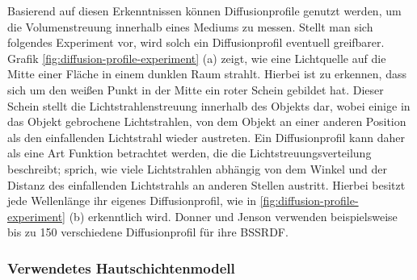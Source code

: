 \documentclass[ngerman,runningheads,a4paper]{llncs}[2018/03/10]
\begin{document}
Basierend auf diesen Erkenntnissen können Diffusionprofile genutzt werden, um die Volumenstreuung innerhalb eines Mediums zu messen.
Stellt man sich folgendes Experiment vor, wird solch ein Diffusionprofil eventuell greifbarer.
Grafik \ref{fig:diffusion-profile-experiment} (a) zeigt, wie eine Lichtquelle auf die Mitte einer Fläche in einem dunklen Raum strahlt.
Hierbei ist zu erkennen, dass sich um den weißen Punkt in der Mitte ein roter Schein gebildet hat.
Dieser Schein stellt die Lichtstrahlenstreuung innerhalb des Objekts dar, wobei einige in das Objekt gebrochene Lichtstrahlen, von dem Objekt an einer anderen Position als den einfallenden Lichtstrahl wieder austreten.
Ein Diffusionprofil kann daher als eine Art Funktion betrachtet werden, die die Lichtstreuungsverteilung beschreibt; sprich, wie viele Lichtstrahlen abhängig von dem Winkel und der Distanz des einfallenden Lichtstrahls an anderen Stellen austritt.
Hierbei besitzt jede Wellenlänge ihr eigenes Diffusionprofil, wie in \ref{fig:diffusion-profile-experiment} (b) erkenntlich wird.
Donner und Jenson \cite{spectral-bssrdf-human-skin} verwenden beispielsweise bis zu 150 verschiedene Diffusionprofil für ihre BSSRDF.

\subsubsection{Verwendetes Hautschichtenmodell}
\label{sub:skin-model}
\end{document}
